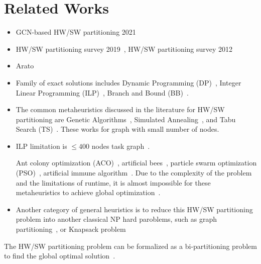 \section{Related Works}

\begin{itemize}
    \item GCN-based HW/SW partitioning 2021~\citep{zheng2021hardware}
    \item HW/SW partitioning survey 2019~\cite{hou2019survey}, 
    HW/SW partitioning survey 2012~\citep{teich2012hardware} %
    \item Arato~\citep{arato2005algorithmic}
    \item Family of exact solutions includes Dynamic Programming (DP)~\citep{}, Integer Linear Programming (ILP)~\citep{}, Branch and Bound (BB)~\citep{}.
    
    \item The common metaheuristics discussed in the literature for HW/SW partitioning are Genetic Algorithms~\citep{}, Simulated Annealing~\citep{}, and Tabu Search (TS)~\citep{}. These works for graph with small number of nodes.

    \item ILP limitation is $\le 400$ nodes task graph~\citep{trindade2016applying}.
    
    Ant colony optimization (ACO)~\citep{}, artificial bees~\citep{}, particle swarm optimization (PSO)~\citep{}, artificial immune algorithm~\citep{}. Due to the complexity of the problem and the limitations of runtime, it is almost impossible for these metaheuristics to achieve global optimization~\citep{hou2019survey}.

    \item Another category of general heuristics is to reduce this HW/SW partitioning problem into another classical NP hard paroblems, such as graph partitioning~\citep{arato2005algorithmic}, or Knapsack problem~\citep{}
    
    
\end{itemize}

The HW/SW partitioning problem can be formalized as a bi-partitioning problem to find the global optimal solution~\citep{han2013efficient}.


